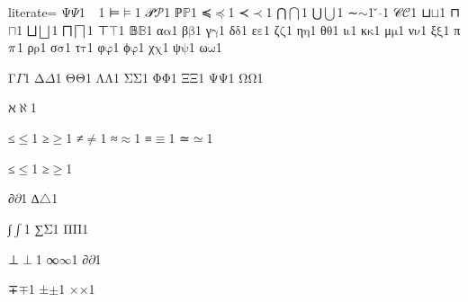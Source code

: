 {%
literate=
{Ψ}{{\ensuremath{\Psi}}}1
{⠀}{{\ensuremath{ }}}1
{⊨}{{\ensuremath{\models}}}1
{𝒫}{{\ensuremath{\mathcal{P}}}}1
{ℙ}{{\ensuremath{\mathbb{P}}}}1
{≼}{{\ensuremath{\preceq}}}1
{≺}{{\ensuremath{\prec}}}1
{⋂}{{\ensuremath{\bigcap}}}1
{⋃}{{\ensuremath{\bigcup}}}1
{∼}{{\ensuremath{\sim}}}1
{̌ }{{\ensuremath{\check{}}}}1
{𝒞}{{\ensuremath{\mathcal{C}}}}1
{⊔}{{\ensuremath{\sqcup}}}1
{⊓}{{\ensuremath{\sqcap}}}1
{⨆}{{\ensuremath{\bigsqcup}}}1
{⨅}{{\ensuremath{\bigsqcap}}}1
{⊤}{{\ensuremath{\top}}}1
{𝔹}{{\ensuremath{\mathbb{B}}}}1
{α}{{\ensuremath{\mathrm{\alpha}}}}1
{β}{{\ensuremath{\mathrm{\beta}}}}1
{γ}{{\ensuremath{\mathrm{\gamma}}}}1
{δ}{{\ensuremath{\mathrm{\delta}}}}1
{ε}{{\ensuremath{\mathrm{\varepsilon}}}}1
{ζ}{{\ensuremath{\mathrm{\zeta}}}}1
{η}{{\ensuremath{\mathrm{\eta}}}}1
{θ}{{\ensuremath{\mathrm{\theta}}}}1
{ι}{{\ensuremath{\mathrm{\iota}}}}1
{κ}{{\ensuremath{\mathrm{\kappa}}}}1
{μ}{{\ensuremath{\mathrm{\mu}}}}1
{ν}{{\ensuremath{\mathrm{\nu}}}}1
{ξ}{{\ensuremath{\mathrm{\xi}}}}1
{π}{{\ensuremath{\mathrm{\mathnormal{\pi}}}}}1
{ρ}{{\ensuremath{\mathrm{\rho}}}}1
{σ}{{\ensuremath{\mathrm{\sigma}}}}1
{τ}{{\ensuremath{\mathrm{\tau}}}}1
{φ}{{\ensuremath{\mathrm{\varphi}}}}1
{ϕ}{{\ensuremath{\mathrm{\varphi}}}}1
{χ}{{\ensuremath{\mathrm{\chi}}}}1
{ψ}{{\ensuremath{\mathrm{\psi}}}}1
{ω}{{\ensuremath{\mathrm{\omega}}}}1

{Γ}{{\ensuremath{\Gamma}}}1
{Δ}{{\ensuremath{\Delta}}}1
{Θ}{{\ensuremath{\mathrm{\Theta}}}}1
{Λ}{{\ensuremath{\mathrm{\Lambda}}}}1
{Σ}{{\ensuremath{\mathrm{\Sigma}}}}1
{Φ}{{\ensuremath{\mathrm{\Phi}}}}1
{Ξ}{{\ensuremath{\mathrm{\Xi}}}}1
{Ψ}{{\ensuremath{\mathrm{\Psi}}}}1
{Ω}{{\ensuremath{\mathrm{\Omega}}}}1

{ℵ}{{\ensuremath{\aleph}}}1

{≤}{{\ensuremath{\leq}}}1
{≥}{{\ensuremath{\geq}}}1
{≠}{{\ensuremath{\neq}}}1
{≈}{{\ensuremath{\approx}}}1
{≡}{{\ensuremath{\equiv}}}1
{≃}{{\ensuremath{\simeq}}}1

{≤}{{\ensuremath{\leq}}}1
{≥}{{\ensuremath{\geq}}}1

{∂}{{\ensuremath{\partial}}}1
{∆}{{\ensuremath{\triangle}}}1 %

{∫}{{\ensuremath{\int}}}1
{∑}{{\ensuremath{\mathrm{\Sigma}}}}1
{Π}{{\ensuremath{\mathrm{\Pi}}}}1

{⊥}{{\ensuremath{\perp}}}1
{∞}{{\ensuremath{\infty}}}1
{∂}{{\ensuremath{\partial}}}1

{∓}{{\ensuremath{\mp}}}1
{±}{{\ensuremath{\pm}}}1
{×}{{\ensuremath{\times}}}1

}
